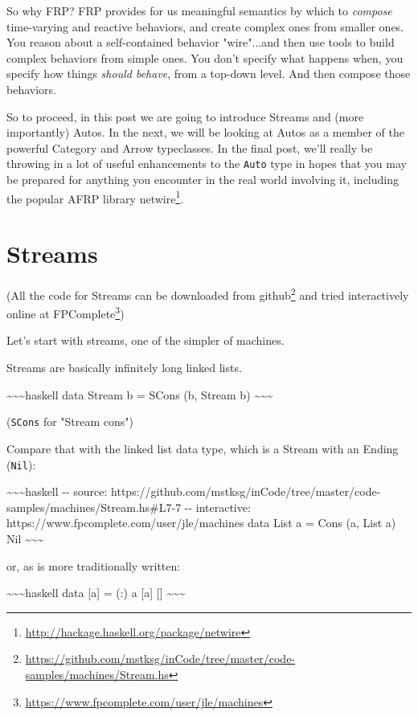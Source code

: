 \documentclass[]{article}
\renewcommand{\href}[2]{#2\footnote{\url{#1}}}
\begin{document}
So why FRP? FRP provides for us meaningful semantics by which to \emph{compose}
time-varying and reactive behaviors, and create complex ones from smaller ones.
You reason about a self-contained behavior "wire"...and then use tools to build
complex behaviors from simple ones. You don't specify what happens when, you
specify how things \emph{should behave}, from a top-down level. And then compose
those behaviors.

So to proceed, in this post we are going to introduce Streams and (more
importantly) Autos. In the next, we will be looking at Autos as a member of the
powerful Category and Arrow typeclasses. In the final post, we'll really be
throwing in a lot of useful enhancements to the \texttt{Auto} type in hopes that
you may be prepared for anything you encounter in the real world involving it,
including the popular AFRP library
\href{http://hackage.haskell.org/package/netwire}{netwire}.

\section{Streams}

(All the code for Streams can be downloaded
\href{https://github.com/mstksg/inCode/tree/master/code-samples/machines/Stream.hs}{from
github} and tried interactively online
\href{https://www.fpcomplete.com/user/jle/machines}{at FPComplete})

Let's start with streams, one of the simpler of machines.

Streams are basically infinitely long linked lists.

\textasciitilde{}\textasciitilde{}\textasciitilde{}haskell data Stream b = SCons
(b, Stream b) \textasciitilde{}\textasciitilde{}\textasciitilde{}

(\texttt{SCons} for "Stream cons")

Compare that with the linked list data type, which is a Stream with an Ending
(\texttt{Nil}):

\textasciitilde{}\textasciitilde{}\textasciitilde{}haskell -\/- source:
https://github.com/mstksg/inCode/tree/master/code-samples/machines/Stream.hs\#L7-7
-\/- interactive: https://www.fpcomplete.com/user/jle/machines data List a =
Cons (a, List a) \textbar{} Nil
\textasciitilde{}\textasciitilde{}\textasciitilde{}

or, as is more traditionally written:

\textasciitilde{}\textasciitilde{}\textasciitilde{}haskell data {[}a{]} = (:) a
{[}a{]} \textbar{} {[}{]} \textasciitilde{}\textasciitilde{}\textasciitilde{}
\end{document}
